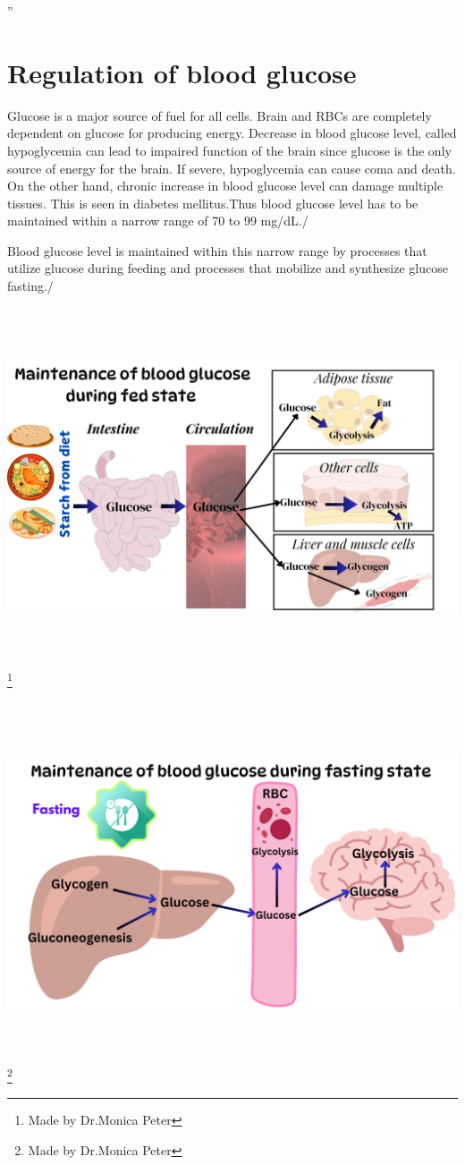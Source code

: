 \documentclass[
]{book}
\begin{document}
''

\chapter{Regulation of blood glucose}\label{regulation-of-blood-glucose}

Glucose is a major source of fuel for all cells. Brain and RBCs are completely dependent on glucose for producing energy. Decrease in blood glucose level, called hypoglycemia can lead to impaired function of the brain since glucose is the only source of energy for the brain. If severe, hypoglycemia can cause coma and death. On the other hand, chronic increase in blood glucose level can damage multiple tissues. This is seen in diabetes mellitus.Thus blood glucose level has to be maintained within a narrow range of 70 to 99 mg/dL./

Blood glucose level is maintained within this narrow range by processes that utilize glucose during feeding and processes that mobilize and synthesize glucose fasting./

\includegraphics[width=\textwidth,height=4.16667in]{Images/feeding.png}
\footnote{Made by Dr.Monica Peter}

\includegraphics[width=\textwidth,height=4.16667in]{Images/fasting.png}
\footnote{Made by Dr.Monica Peter}
\end{document}
